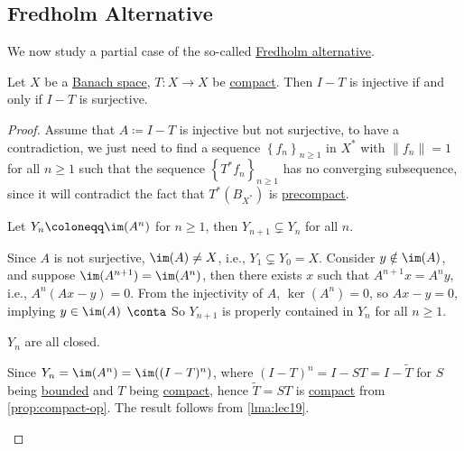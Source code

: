 \subsection{Fredholm Alternative}
We now study a partial case of the so-called \hyperref[thm:Fredholm-alternative]{Fredholm alternative}.

\begin{theorem}\label{thm:Fredholm-alternative}
	Let \(X\) be a \hyperref[def:Banach-space]{Banach space}, \(T\colon X\to  X\) be \hyperref[def:compact-op]{compact}. Then \(I - T\) is injective if and only if \(I - T\) is surjective.
\end{theorem}
\begin{proof}
	Assume that \(A\coloneqq I - T\) is injective but not surjective, to have a contradiction, we just need to find a sequence \(\left\{ f_{n}  \right\}_{n\geq 1} \) in \(X^{\ast} \) with \(\lVert f_{n}  \rVert = 1\) for all \(n\geq 1\) such that the sequence \(\left\{ T^{\ast} f_n \right\}_{n\geq 1} \) has no converging subsequence, since it will contradict the fact that \(T^{\ast} (B_{X^{\ast} })\) is \hyperref[def:precompact]{precompact}.

	\begin{claim}
		Let \(Y_n \coloneqq \im(A^n)\) for \(n\geq 1\), then \(Y_{n+ 1} \subsetneq Y_n\) for all \(n\).
	\end{claim}
	\begin{explanation}
		Since \(A\) is not surjective, \(\im(A) \neq X\), i.e., \(Y_1 \subsetneq Y_0 = X\). Consider \(y \notin \im(A)\), and suppose \(\im(A^{n+1})= \im(A^n)\), then there exists \(x\) such that \(A^{n+1}x = A^n y\), i.e., \(A^n (Ax - y) = 0\). From the injectivity of \(A\), \(\ker(A^n) = 0\), so \(Ax - y = 0\), implying \(y\in \im(A)\) \(\conta\) So \(Y_{n+1}\) is properly contained in \(Y_n\) for all \(n\geq 1\).
	\end{explanation}

	\begin{claim}
		\(Y_n\) are all closed.
	\end{claim}
	\begin{explanation}
		Since \(Y_n = \im(A^n) = \im((I-T)^n)\), where \((I-T)^n = I - ST = I - \widetilde{T}\) for \(S\) being \hyperref[def:bounded-map]{bounded} and \(T\) being \hyperref[def:compact-op]{compact}, hence \(\widetilde{T} = ST\) is \hyperref[def:compact-op]{compact} from \autoref{prop:compact-op}. The result follows from \autoref{lma:lec19}.
	\end{explanation}


\end{proof}
